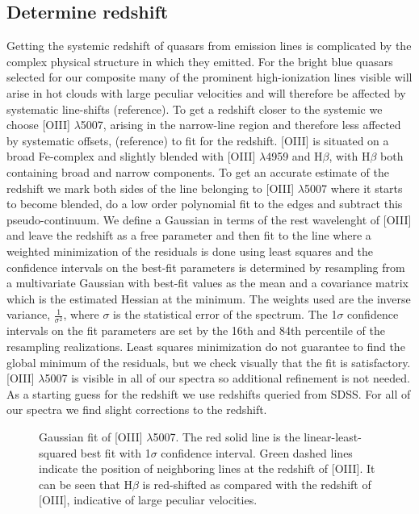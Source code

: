 \documentclass[iop]{emulateapj}
\begin{document}
\subsection{Determine redshift}
Getting the systemic redshift of quasars from emission lines is complicated by the complex physical structure in which they emitted. For the bright blue quasars selected for our composite many of the prominent high-ionization lines visible will arise in hot clouds with large peculiar velocities and will therefore be affected by systematic line-shifts (reference). To get a redshift closer to the systemic we choose [OIII] $\lambda$5007,  arising in the narrow-line region and therefore less affected by systematic offsets, (reference) to fit for the redshift. [OIII] is situated on a broad Fe-complex and slightly blended with [OIII] $\lambda$4959 and H$\beta$, with H$\beta$ both containing broad and narrow components. To get an accurate estimate of the redshift we mark both sides of the line belonging to [OIII] $\lambda$5007 where it starts to become blended, do a low order polynomial fit to the edges and subtract this pseudo-continuum. We define a Gaussian in terms of the rest wavelenght of [OIII] and leave the redshift as a free parameter and then fit to the line where a weighted minimization of the residuals is done using least squares and the confidence intervals on the best-fit parameters is determined by resampling from a multivariate Gaussian with best-fit values as the mean and a covariance matrix which is the estimated Hessian at the minimum. The weights used are the inverse variance, $\frac{1}{\sigma^2}$, where $\sigma$ is the statistical error of the spectrum. The 1$\sigma$ confidence intervals on the fit parameters are set by the 16th and 84th percentile of the resampling realizations. Least squares minimization do not guarantee to find the global minimum of the residuals, but we check visually that the fit is satisfactory. [OIII] $\lambda$5007 is visible in all of our spectra so additional refinement is not needed. As a starting guess for the redshift we use redshifts queried from SDSS. For all of our spectra we find slight corrections to the redshift.

\begin{figure}
\caption{Gaussian fit of [OIII] $\lambda$5007. The red solid line is the linear-least-squared best fit with 1$\sigma$ confidence interval. Green dashed lines indicate the position of neighboring lines at the redshift of [OIII]. It can be seen that H$\beta$ is red-shifted as compared with the redshift of [OIII], indicative of large peculiar velocities.\label{linefit}}
\end{figure}
\end{document}
